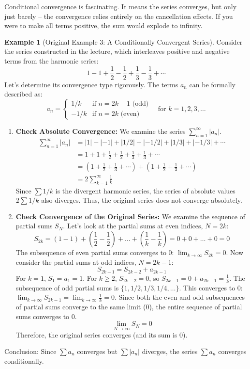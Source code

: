 \documentclass[11pt, letterpaper]{article}
\theoremstyle{plain} %
\theoremstyle{definition} %
\newtheorem{example}[theorem]{Example} %
\theoremstyle{remark} %
\newcommand{\abs}[1]{\left|#1\right|} %
\begin{document}
Conditional convergence is fascinating. It means the series converges, but only just barely – the convergence relies entirely on the cancellation effects. If you were to make all terms positive, the sum would explode to infinity.

\begin{example}[Original Example 3: A Conditionally Convergent Series]
Consider the series constructed in the lecture, which interleaves positive and negative terms from the harmonic series:
\[ 1 - 1 + \frac{1}{2} - \frac{1}{2} + \frac{1}{3} - \frac{1}{3} + \dotsb \]
Let's determine its convergence type rigorously.
The terms $a_n$ can be formally described as:
\[ a_n = \begin{cases} 1/k & \text{if } n = 2k-1 \text{ (odd)} \\ -1/k & \text{if } n = 2k \text{ (even)} \end{cases} \quad \text{for } k=1, 2, 3, \dots \]
\begin{enumerate}
    \item \textbf{Check Absolute Convergence:} We examine the series $\sum_{n=1}^{\infty} \abs{a_n}$.
    \begin{align*} \sum_{n=1}^{\infty} \abs{a_n} &= \abs{1} + \abs{-1} + \abs{1/2} + \abs{-1/2} + \abs{1/3} + \abs{-1/3} + \dotsb \\ &= 1 + 1 + \frac{1}{2} + \frac{1}{2} + \frac{1}{3} + \frac{1}{3} + \dotsb \\ &= (1+\frac{1}{2}+\frac{1}{3}+\dotsb) + (1+\frac{1}{2}+\frac{1}{3}+\dotsb) \\ &= 2 \sum_{k=1}^{\infty} \frac{1}{k} \end{align*}
    Since $\sum 1/k$ is the divergent harmonic series, the series of absolute values $2 \sum 1/k$ also diverges. Thus, the original series does not converge absolutely.

    \item \textbf{Check Convergence of the Original Series:} We examine the sequence of partial sums $S_N$.
    Let's look at the partial sums at even indices, $N=2k$:
    \[ S_{2k} = (1-1) + (\frac{1}{2}-\frac{1}{2}) + \dots + (\frac{1}{k}-\frac{1}{k}) = 0 + 0 + \dots + 0 = 0 \]
    The subsequence of even partial sums converges to 0: $\lim_{k \to \infty} S_{2k} = 0$.
    Now consider the partial sums at odd indices, $N=2k-1$:
    \[ S_{2k-1} = S_{2k-2} + a_{2k-1} \]
    For $k=1$, $S_1 = a_1 = 1$.
    For $k \ge 2$, $S_{2k-2}=0$, so $S_{2k-1} = 0 + a_{2k-1} = \frac{1}{k}$.
    The subsequence of odd partial sums is $\{1, 1/2, 1/3, 1/4, \dots\}$. This converges to 0: $\lim_{k \to \infty} S_{2k-1} = \lim_{k \to \infty} \frac{1}{k} = 0$.
    Since both the even and odd subsequences of partial sums converge to the same limit (0), the entire sequence of partial sums converges to 0.
    \[ \lim_{N \to \infty} S_N = 0 \]
    Therefore, the original series converges (and its sum is 0).
\end{enumerate}
Conclusion: Since $\sum a_n$ converges but $\sum \abs{a_n}$ diverges, the series $\sum a_n$ converges conditionally.


\end{example}
\end{document}
